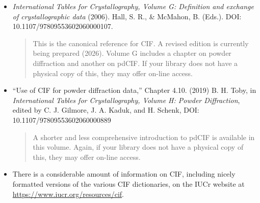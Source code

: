 \begin{itemize}
\item 
  \textit{International Tables for Crystallography, Volume G: Definition and exchange of crystallographic data} (2006). Hall, S. R., \& McMahon, B. (Eds.). DOI: 10.1107/97809553602060000107. 
  \begin{quote}
  This is the canonical reference for CIF. A revised edition is currently being prepared (2026). Volume G includes a chapter on powder diffraction and another on pdCIF. If your library does not have a physical copy of this, they may offer on-line access.
  \end{quote}

\item 
  ``Use of CIF for powder diffraction data,'' Chapter 4.10. (2019) B. H. Toby, in \textit{International Tables for Crystallography, Volume H: Powder Diffraction}, edited by C. J. Gilmore, J. A. Kaduk, and H. Schenk, DOI: 10.1107/97809553602060000889
  \begin{quote}
A shorter and less comprehensive introduction to pdCIF is available in this volume. Again, if your library does not have a physical copy of this, they may offer on-line access.
  \end{quote}

\item 
  There is a considerable amount of information on CIF, including nicely formatted versions of the various CIF dictionaries, on the IUCr website at \url{https://www.iucr.org/resources/cif}.

\end{itemize}
